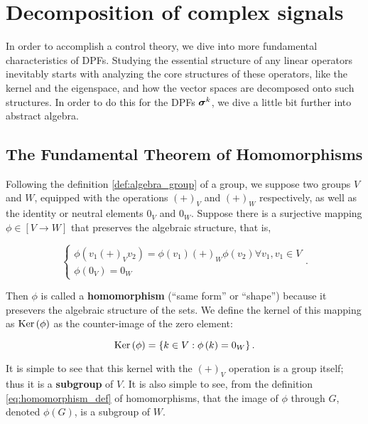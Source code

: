 \section{Decomposition of complex signals} %

	In order to accomplish a control theory, we dive into more fundamental characteristics of DPFs. Studying the essential structure of any linear operators inevitably starts with analyzing the core structures of these operators, like the kernel and the eigenspace, and how the vector spaces are decomposed onto such structures. In order to do this for the DPFs $\boldsymbol{\sigma}^{k}$, we dive a little bit further into abstract algebra.

\subsection{The Fundamental Theorem of Homomorphisms} \label{subsec:first_homo}%

	Following the definition \ref{def:algebra_group} of a group, we suppose two groups $V$ and $W$, equipped with the operations $\left(+\right)_V$ and $(+)_W$ respectively, as well as the identity or neutral elements $0_V$ and $0_W$. Suppose there is a surjective mapping $\phi\in\left[V\to W\right]$ that preserves the algebraic structure, that is,

\begin{equation}\left\{\begin{array}{l} \phi\left(v_1 \left(+\right)_V v_2\right) = \phi\left(v_1\right)\left(+\right)_W\phi\left(v_2\right) \forall v_1,v_1\in V \\[5mm] \phi\left(0_V\right) = 0_W\end{array}\right. . \label{eq:homomorphism_def}\end{equation}

	Then $\phi$ is called a \textbf{homomorphism} (``same form'' or ``shape'') because it presevers the algebraic structure of the sets. We define the kernel of this mapping as $\operatorname{Ker}\left(\phi\right)$ as the counter-image of the zero element:

\begin{equation} \operatorname{Ker}\left(\phi\right) = \left\{k\in V: \phi\left(k\right) = 0_W\right\} .\end{equation}

	It is simple to see that this kernel with the $(+)_V$ operation is a group itself; thus it is a \textbf{subgroup} of $V$. It is also simple to see, from the definition \eqref{eq:homomorphism_def} of homomorphisms, that the image of $\phi$ through $G$, denoted $\phi(G)$, is a subgroup of $W$.

